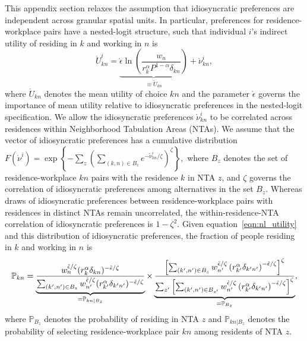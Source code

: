 \documentclass[11pt]{article}
\theoremstyle{definition}
\newcommand\idiosyncraticphrase{idiosyncratic preference}
\begin{document}
This appendix section relaxes the assumption that \idiosyncraticphrase s are independent across granular spatial units.
In particular, preferences for residence-workplace pairs have a nested-logit structure,
such that
individual $i$'s indirect utility of residing in $k$ and working in $n$ is
\begin{equation} \label{eqn:nl_utility}
\mathring{U}_{kn}^{i} = \underbrace{\mathring{\epsilon} \ln\left(\frac{w_n}{r_k^\alpha P^{1-\alpha} \delta_{kn}}\right)}_{\equiv \mathring{U}_{kn}} + \mathring{\nu}_{kn}^i
,
\end{equation}
where $\mathring{U}_{kn}$ denotes the mean utility of choice ${kn}$
and
the parameter $\mathring{\epsilon}$ governs the importance of mean utility relative to \idiosyncraticphrase s
in the nested-logit specification.
We allow the \idiosyncraticphrase s $\mathring{\nu}_{kn}^i$ to be correlated across residences within Neighborhood Tabulation Areas (NTAs).
We assume that the vector of \idiosyncraticphrase s has a cumulative distribution
\(
   F(\mathring{\nu}^{i}) = \exp \left\{-\sum_{z} \left(\sum_{(k,n) \in B_z} e^{-\mathring{\nu}_{kn}^i/\zeta}\right)^{\zeta} \right\},
\)
where $B_z$ denotes the set of residence-workplace $kn$ pairs with the residence $k$ in NTA $z$, and
$\zeta$ governs the correlation of \idiosyncraticphrase s
among alternatives in the set $B_z$. 
Whereas draws of idiosyncratic preferences between residence-workplace pairs with residences in distinct NTAs remain uncorrelated,
the within-residence-NTA correlation of idiosyncratic preferences is $1-\zeta^2$.
Given equation~\eqref{eqn:nl_utility} and this distribution of idiosyncratic preferences,
the fraction of people residing in $k$ and working in $n$ is
\begin{equation*}\label{eqn:cont_laborallocation_nestedlogit}
  \mathbb{P}_{kn} 
  =
  \underbrace{
  \frac{
    w_n^{\mathring{\epsilon}/\zeta}(r_k^\alpha \delta_{kn})^{-\mathring{\epsilon}/\zeta}
  }{
   \sum_{(k',n') \in B_z}  w_{n'}^{\mathring{\epsilon}/\zeta}(r_{k'}^\alpha \delta_{k'n'})^{-\mathring{\epsilon}/\zeta}
  }}_{= \mathbb{P}_{kn|B_z}}
  \times
  \underbrace{
  \frac{%
    \left[ \sum_{(k',n')\in B_z} w_{n'}^{\mathring{\epsilon}/\zeta} \left( r_{k'}^\alpha \delta_{k'n'} \right)^{-\mathring{\epsilon}/\zeta} \right]^{\zeta}
  }{%
    \sum_{z'} \left[ \sum_{(k',n')\in B_{z'}}  w_{n'}^{\mathring{\epsilon}/\zeta} \left( r_{k'}^\alpha \delta_{k'n'} \right)^{-\mathring{\epsilon}/\zeta} \right]^{\zeta}
  }
  }_{= \mathbb{P}_{B_z}}
,\end{equation*}
where
$\mathbb{P}_{B_{z}}$ denotes the probability of residing in NTA $z$
and
$\mathbb{P}_{kn|B_z}$ denotes the probability of selecting residence-workplace pair $kn$ among residents of NTA $z$.
\end{document}
